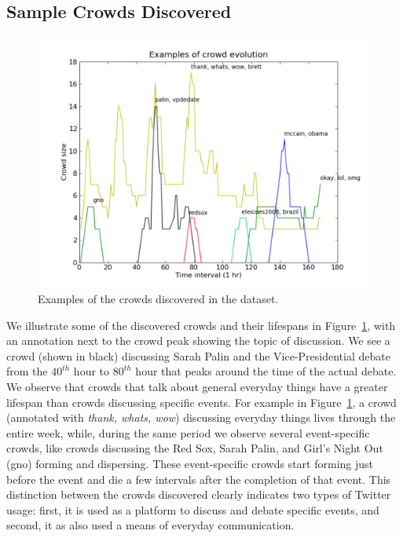 \documentclass{sig-alternate}
\begin{document}
\subsection{Sample Crowds Discovered}
\begin{figure}[!t]
\centering
\includegraphics[width=\linewidth]{images/clusterExamplesOverTime}
\caption{Examples of the crowds discovered in the dataset.}
\label{fig:cluster-example}
\end{figure}
We illustrate
some of the discovered crowds and their lifespans in
Figure~\ref{fig:cluster-example}, with an annotation next to the crowd peak
showing the topic of discussion. We see a crowd (shown in black)
discussing Sarah Palin and the Vice-Presidential debate from the $40^{th}$ hour
to $80^{th}$ hour that peaks around the time of the actual debate. We
observe that crowds that talk about general everyday things have a greater
lifespan than crowds discussing specific events. For example in
Figure~\ref{fig:cluster-example}, a crowd (annotated with \textit{thank, whats,
wow}) discussing everyday things lives through the entire week, while, during the
same period we observe several event-specific crowds, like crowds discussing the
Red Sox, Sarah Palin, and Girl's Night Out (gno) forming and dispersing. These
event-specific crowds start forming just before the event and die a few intervals
after the completion of that event. This distinction between the crowds
discovered clearly indicates two types of Twitter usage: first, it is used as a
platform to discuss and debate specific events, and second, it as also used a means of
everyday communication.
\end{document}
